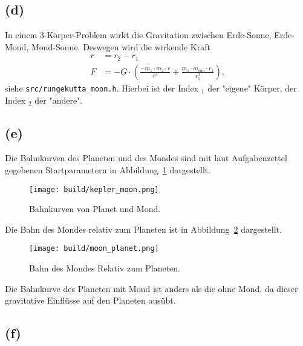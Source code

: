 \documentclass{scrartcl}
\begin{document}
\subsection*{(d)}
In einem 3-Körper-Problem wirkt die Gravitation zwischen Erde-Sonne, Erde-Mond, Mond-Sonne.
Deswegen wird die wirkende Kraft
\begin{align}
  r &= r_2 - r_1 \\
  F &= - G \cdot \left(\frac{- m_1 \cdot m_2 \cdot r}{r^3} + \frac{m_1 \cdot m_{\text{sun}} \cdot
    r_1}{r_1^3}\right)\text{,}
\end{align}
siehe \texttt{src/rungekutta\_moon.h}.
Hierbei ist der Index ${}_1$ der "eigene" Körper,
der Index ${}_2$ der "andere".
\subsection*{(e)}
Die Bahnkurven des Planeten und des Mondes sind mit laut Aufgabenzettel gegebenen Startparametern
in Abbildung~\ref{fig:kepler_moon} dargestellt.
\begin{figure}[ht]
  \centering
  \texttt{[image: build/kepler\_moon.png]}
  \caption{Bahnkurven von Planet und Mond.}%
  \label{fig:kepler_moon}
\end{figure}

Die Bahn des Mondes relativ zum Planeten ist in Abbildung~\ref{fig:moon_planet} dargestellt.
\begin{figure}[ht]
  \centering
  \texttt{[image: build/moon\_planet.png]}
  \caption{Bahn des Mondes Relativ zum Planeten.}%
  \label{fig:moon_planet}
\end{figure}

Die Bahnkurve des Planeten mit Mond ist anders als die ohne Mond, da dieser gravitative Einflüsse auf den
Planeten ausübt.
\subsection*{(f)}
\end{document}
